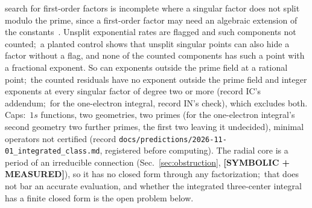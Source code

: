 \documentclass[aps,pra,twocolumn,superscriptaddress,longbibliography]{revtex4-2}
\begin{document}
search for first-order factors is incomplete where a singular factor does not split modulo the
prime, since a first-order factor may need an algebraic extension of the
constants~\cite{cluzeau_vanhoeij2004}.  Unsplit exponential rates
are flagged and such components not counted;\ a planted control shows that unsplit singular points
can also hide a factor without a flag, and none of the counted components has such a point with a
fractional exponent.  So can exponents outside the prime field at a rational point;\ the counted
residuals have no exponent outside the prime field and integer exponents at every singular factor
of degree two or more (record IC's addendum;\ for the one-electron integral, record IN's check), which
excludes both.  Caps:\ $1s$ functions, two
geometries, two primes (for the one-electron integral's second geometry two further primes, the
first two leaving it undecided), minimal operators not
certified (record \texttt{docs/predictions/2026-11-01\_integrated\_class.md}, registered before
computing).  The radial core is a period of an irreducible connection
(Sec.~\ref{sec:obstruction}, \textbf{[SYMBOLIC + MEASURED]}), so it has no
closed form through any factorization;\ that does not bar an accurate
evaluation, and whether the integrated three-center integral has a finite
closed form is the open problem below.
\end{document}
